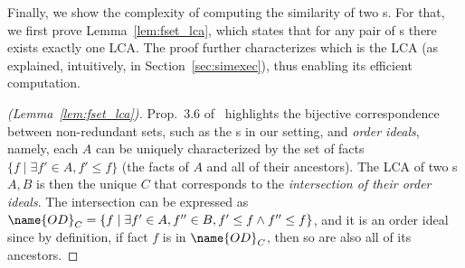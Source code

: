 Finally, we show the complexity of computing the similarity of two \fset{}s. For that, we first prove Lemma~\ref{lem:fset_lca}, which states that for any pair of \fset{}s there exists exactly one LCA. The proof further characterizes which \fset{} is the LCA (as explained, intuitively, in Section~\ref{sec:simexec}), thus enabling its efficient computation.

\begin{proof}[(Lemma~\ref{lem:fset_lca})]
Prop.~3.6 of~\cite{amarilli2014complexity} highlights the bijective correspondence between non-redundant sets, such as the \fset{}s in our setting, and \emph{order ideals}, namely, each \fset{} $A$ can be uniquely characterized by the set of facts $\{f\mid \exists f'\in A, f'\leq f\}$ (the facts of $A$ and all of their ancestors). The LCA of two \fset{}s $A,B$ is then the unique \fset{} $C$ that corresponds to the \emph{intersection of their order ideals}. The intersection can be expressed as $\name{OD}_C=\{f\mid \exists f'\in A,f''\in B, f'\leq f \wedge f'' \leq f\}$, and it is an order ideal since by definition, if fact $f$ is in $\name{OD}_C$, then so are also all of its ancestors.
\end{proof}

